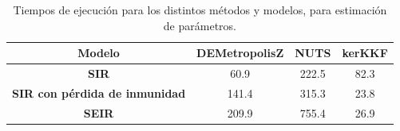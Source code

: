 \begin{table}[h!]
    \centering
    \caption{Tiempos de ejecución para los distintos métodos y modelos, para estimación de parámetros.} 
    \begin{tabular}{|c|c|c|c|}
    \hline
    \textbf{Modelo} & \textbf{DEMetropolisZ} & \textbf{NUTS} & \textbf{kerKKF}  \\ \hline
    \textbf{SIR} & 60.9 & 222.5 & 82.3 \\ \hline
    \textbf{SIR con pérdida de inmunidad} & 141.4 & 315.3 & 23.8 \\ \hline
    \textbf{SEIR} & 209.9 & 755.4 & 26.9 \\ \hline
    \end{tabular}
    \label{tab:ex_times}
\end{table}